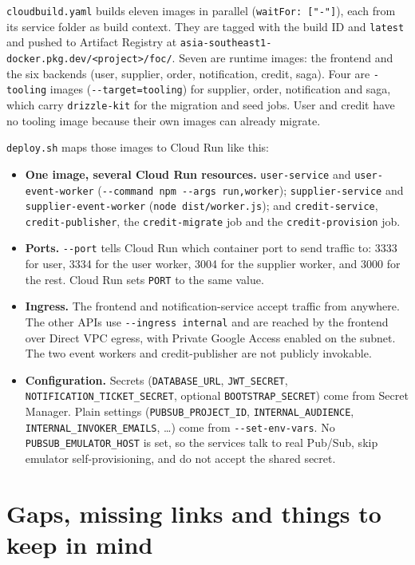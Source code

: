 \documentclass[11pt,a4paper]{article}
\newcommand{\code}[1]{\nolinkurl{#1}}
\begin{document}
\code{cloudbuild.yaml} builds eleven images in parallel (\code{waitFor: ["-"]}), each
from its service folder as build context. They are tagged with the build ID and
\code{latest} and pushed to Artifact Registry at
\code{asia-southeast1-docker.pkg.dev/<project>/foc/}. Seven are runtime images: the
frontend and the six backends (user, supplier, order, notification, credit, saga). Four
are \code{-tooling} images (\code{--target=tooling}) for supplier, order, notification
and saga, which carry \code{drizzle-kit} for the migration and seed jobs. User and credit
have no tooling image because their own images can already migrate.

\code{deploy.sh} maps those images to Cloud Run like this:
\begin{itemize}
  \item \textbf{One image, several Cloud Run resources.} \code{user-service} and
  \code{user-event-worker} (\code{--command npm --args run,worker}); \code{supplier-service}
  and \code{supplier-event-worker} (\code{node dist/worker.js}); and
  \code{credit-service}, \code{credit-publisher}, the \code{credit-migrate} job and the
  \code{credit-provision} job.
  \item \textbf{Ports.} \code{--port} tells Cloud Run which container port to send
  traffic to: 3333 for user, 3334 for the user worker, 3004 for the supplier worker, and
  3000 for the rest. Cloud Run sets \code{PORT} to the same value.
  \item \textbf{Ingress.} The frontend and notification-service accept traffic from
  anywhere. The other APIs use \code{--ingress internal} and are reached by the frontend
  over Direct VPC egress, with Private Google Access enabled on the subnet. The two event
  workers and credit-publisher are not publicly invokable.
  \item \textbf{Configuration.} Secrets (\code{DATABASE_URL}, \code{JWT_SECRET},
  \code{NOTIFICATION_TICKET_SECRET}, optional \code{BOOTSTRAP_SECRET}) come from Secret
  Manager. Plain settings (\code{PUBSUB_PROJECT_ID}, \code{INTERNAL_AUDIENCE},
  \code{INTERNAL_INVOKER_EMAILS}, \ldots) come from \code{--set-env-vars}. No
  \code{PUBSUB_EMULATOR_HOST} is set, so the services talk to real Pub/Sub, skip
  emulator self-provisioning, and do not accept the shared secret.
\end{itemize}

\section{Gaps, missing links and things to keep in mind}
\label{sec:gaps}
\end{document}
